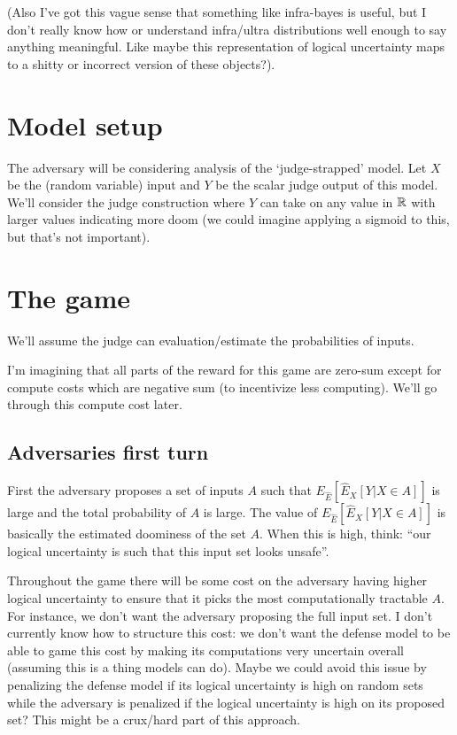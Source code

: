 \documentclass{pset}
\begin{document}
(Also I've got this vague sense that something like infra-bayes is useful, but
I don't really know how or understand infra/ultra distributions well enough to
say anything meaningful. Like maybe this representation of logical uncertainty
maps to a shitty or incorrect version of these objects?).

\section{Model setup}

The adversary will be considering analysis of the `judge-strapped' model. Let
$X$ be the (random variable) input and $Y$ be the scalar judge output of this model. We'll
consider the judge construction where $Y$ can take on any value in $\mathbb{R}$ with
larger values indicating more doom (we could imagine applying a sigmoid to
this, but that's not important).

\section{The game}

We'll assume the judge can evaluation/estimate the probabilities of
inputs.

I'm imagining that all parts of the reward for this game are zero-sum except
for compute costs which are negative sum (to incentivize less computing). We'll
go through this compute cost later.

\subsection{Adversaries first turn}

First the adversary proposes a set of inputs $A$ 
such that $E_{\hat{E}}[\hat{E}_X[Y | X \in A]]$ is large and the total probability
of $A$ is large. 
The value of $E_{\hat{E}}[\hat{E}_X[Y | X \in A]]$ is basically
the estimated doominess of the set $A$.
When this is high, think: ``our logical uncertainty is such that this input set
looks unsafe''.

Throughout the game there will be some cost on the adversary having higher
logical uncertainty to ensure that it picks the most computationally tractable
$A$. For instance, we don't want the adversary proposing the full input
set. I don't currently know how to structure this cost: we don't want the
defense model to be able to game this cost by making its computations very
uncertain overall (assuming this is a thing models can do). Maybe we could
avoid this issue by penalizing the defense model if its logical uncertainty
is high on random sets while the adversary is penalized if the logical
uncertainty is high on its proposed set? This might be a crux/hard
part of this approach.
\end{document}
